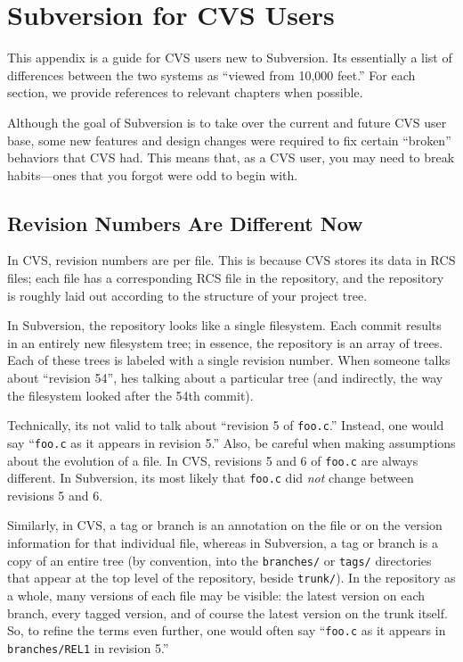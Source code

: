 \chapter{Subversion for CVS Users}\label{svn.forcvs}

This appendix is a guide for CVS users new to Subversion.
It\textquotesingle s essentially a list of differences between the two
systems as ``viewed from 10,000 feet.'' For each section, we provide
references to relevant chapters when possible.

Although the goal of Subversion is to take over the current and future
CVS user base, some new features and design changes were required to fix
certain ``broken'' behaviors that CVS had. This means that, as a CVS
user, you may need to break habits---ones that you forgot were odd to
begin with.

\section{Revision Numbers Are Different Now}\label{svn.forcvs.revnums}

In CVS, revision numbers are per file. This is because CVS stores its
data in RCS files; each file has a corresponding RCS file in the
repository, and the repository is roughly laid out according to the
structure of your project tree.

In Subversion, the repository looks like a single filesystem. Each
commit results in an entirely new filesystem tree; in essence, the
repository is an array of trees. Each of these trees is labeled with a
single revision number. When someone talks about ``revision 54'',
he\textquotesingle s talking about a particular tree (and indirectly,
the way the filesystem looked after the 54th commit).

Technically, it\textquotesingle s not valid to talk about ``revision 5
of \texttt{foo.c}.'' Instead, one would say ``\texttt{foo.c} as it
appears in revision 5.'' Also, be careful when making assumptions about
the evolution of a file. In CVS, revisions 5 and 6 of \texttt{foo.c} are
always different. In Subversion, it\textquotesingle s most likely that
\texttt{foo.c} did \emph{not} change between revisions 5 and 6.

Similarly, in CVS, a tag or branch is an annotation on the file or on
the version information for that individual file, whereas in Subversion,
a tag or branch is a copy of an entire tree (by convention, into the
\texttt{branches/} or \texttt{tags/} directories that appear at the top
level of the repository, beside \texttt{trunk/}). In the repository as a
whole, many versions of each file may be visible: the latest version on
each branch, every tagged version, and of course the latest version on
the trunk itself. So, to refine the terms even further, one would often
say ``\texttt{foo.c} as it appears in \texttt{branches/REL1} in revision
5.''

